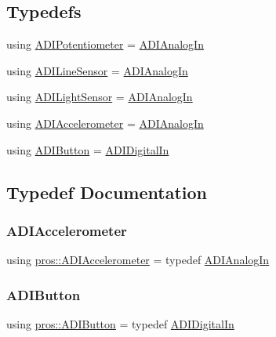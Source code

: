 \subsection*{Typedefs}
\begin{DoxyCompactItemize}
\item 
using \mbox{\hyperlink{namespacepros_a49b07257293eca610437130d01c47b89}{A\+D\+I\+Potentiometer}} = \mbox{\hyperlink{classpros_1_1ADIAnalogIn}{A\+D\+I\+Analog\+In}}
\item 
using \mbox{\hyperlink{namespacepros_a70a7be425ae5e39c353db03e14d62e9a}{A\+D\+I\+Line\+Sensor}} = \mbox{\hyperlink{classpros_1_1ADIAnalogIn}{A\+D\+I\+Analog\+In}}
\item 
using \mbox{\hyperlink{namespacepros_a105b1224da9401cb8b6949713841fed7}{A\+D\+I\+Light\+Sensor}} = \mbox{\hyperlink{classpros_1_1ADIAnalogIn}{A\+D\+I\+Analog\+In}}
\item 
using \mbox{\hyperlink{namespacepros_afb12c694dcb91a1aa04a6ba7cfd9b6c0}{A\+D\+I\+Accelerometer}} = \mbox{\hyperlink{classpros_1_1ADIAnalogIn}{A\+D\+I\+Analog\+In}}
\item 
using \mbox{\hyperlink{namespacepros_a00d5ba20a966a15bf0276ffda24f2dcf}{A\+D\+I\+Button}} = \mbox{\hyperlink{classpros_1_1ADIDigitalIn}{A\+D\+I\+Digital\+In}}
\end{DoxyCompactItemize}


\subsection{Typedef Documentation}
\mbox{\label{namespacepros_afb12c694dcb91a1aa04a6ba7cfd9b6c0}} 
\subsubsection{\texorpdfstring{ADIAccelerometer}{ADIAccelerometer}}
{\footnotesize\ttfamily using \mbox{\hyperlink{namespacepros_afb12c694dcb91a1aa04a6ba7cfd9b6c0}{pros\+::\+A\+D\+I\+Accelerometer}} = typedef \mbox{\hyperlink{classpros_1_1ADIAnalogIn}{A\+D\+I\+Analog\+In}}}

\mbox{\label{namespacepros_a00d5ba20a966a15bf0276ffda24f2dcf}} 
\subsubsection{\texorpdfstring{ADIButton}{ADIButton}}
{\footnotesize\ttfamily using \mbox{\hyperlink{namespacepros_a00d5ba20a966a15bf0276ffda24f2dcf}{pros\+::\+A\+D\+I\+Button}} = typedef \mbox{\hyperlink{classpros_1_1ADIDigitalIn}{A\+D\+I\+Digital\+In}}}

